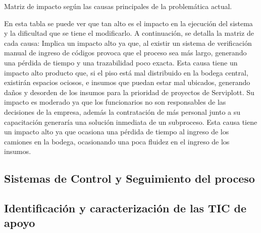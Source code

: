 	
	Matriz de impacto según las causas principales de la problemática actual.
	
	En esta tabla se puede ver que tan alto es el impacto en la ejecución del sistema y la
dificultad que se tiene el modificarlo. A continuación, se detalla la matriz de cada
causa:
 Implica un impacto alto ya que, al existir un sistema de
verificación manual de ingreso de códigos provoca que el proceso sea más largo,
generando una pérdida de tiempo y una trazabilidad poco exacta.
 Esta causa tiene un impacto alto
producto que, si el piso está mal distribuido en la bodega central, existirán espacios
ociosos, e insumos que puedan estar mal ubicados, generando daños y desorden de
los insumos para la prioridad de proyectos de Serviplott.
 Su impacto es moderado ya que los funcionarios no son
responsables de las decisiones de la empresa, además la contratación de más
personal junto a su capacitación generaría una solución inmediata de un subproceso.
 Esta causa tiene un impacto alto ya que ocasiona una pérdida de tiempo
al ingreso de los camiones en la bodega, ocasionando una poca fluidez en el ingreso
de los insumos.


	\subsection{Sistemas de Control y Seguimiento del proceso}
	
	
	\subsection{Identificación y caracterización de las TIC de apoyo}
	
